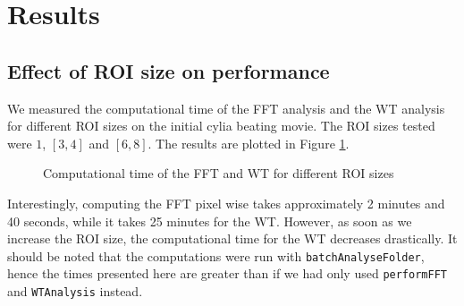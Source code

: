 \documentclass[11pt]{scrartcl}
\begin{document}
\section{Results}

\subsection{Effect of ROI size on performance}
\label{sec:effect-roi-size}

We measured the computational time of the FFT analysis and the WT analysis for different ROI sizes on the
initial cylia beating movie. The ROI sizes tested were $1$, $[3, 4]$ and $[6, 8]$. The results are plotted in
Figure \ref{fig:computational-time}.

\speed
\begin{figure}[ht]
  \begin{minipage}{0.4\linewidth}
    \centering
    \pgfplotstabletypeset[columns={FFT,WT}]\speed
    
  \end{minipage}
  \begin{minipage}{0.6\linewidth}
    \centering
  \end{minipage}
  \caption{Computational time of the FFT and WT for different ROI sizes}
  \label{fig:computational-time}
\end{figure}

Interestingly, computing the FFT pixel wise takes approximately 2 minutes and 40 seconds, while it takes 25
minutes for the WT. However, as soon as we increase the ROI size, the computational time for the WT decreases
drastically. It should be noted that the computations were run with \texttt{batchAnalyseFolder}, hence the
times presented here are greater than if we had only used \texttt{performFFT} and \texttt{WTAnalysis} instead.
\end{document}
